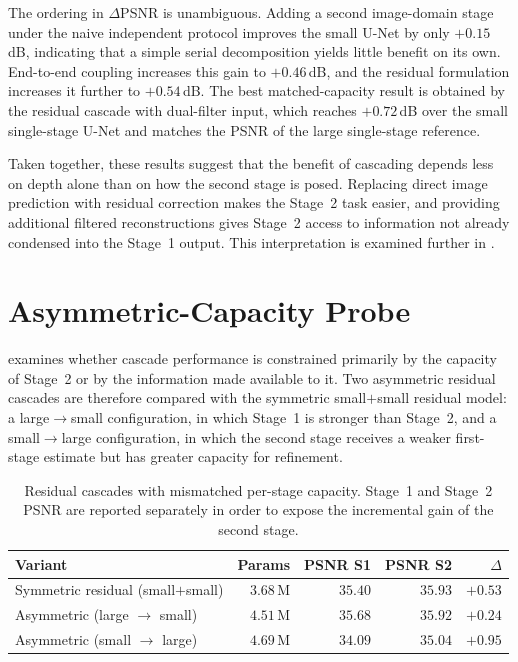 The ordering in $\Delta$PSNR is unambiguous. Adding a second image-domain stage under the naive independent protocol improves the small U-Net by only $+0.15$\,dB, indicating that a simple serial decomposition yields little benefit on its own. End-to-end coupling increases this gain to $+0.46$\,dB, and the residual formulation increases it further to $+0.54$\,dB. The best matched-capacity result is obtained by the residual cascade with dual-filter input, which reaches $+0.72$\,dB over the small single-stage U-Net and matches the PSNR of the large single-stage reference.

Taken together, these results suggest that the benefit of cascading depends less on depth alone than on how the second stage is posed. Replacing direct image prediction with residual correction makes the Stage~2 task easier, and providing additional filtered reconstructions gives Stage~2 access to information not already condensed into the Stage~1 output. This interpretation is examined further in .
\section{Asymmetric-Capacity Probe}
\label{sec:exp_asymmetric}

 examines whether cascade performance is constrained primarily by the capacity of Stage~2 or by the information made available to it. Two asymmetric residual cascades are therefore compared with the symmetric small$+$small residual model: a large$\rightarrow$small configuration, in which Stage~1 is stronger than Stage~2, and a small$\rightarrow$large configuration, in which the second stage receives a weaker first-stage estimate but has greater capacity for refinement.

\begin{table}[!htb]
    \centering
    \caption[Asymmetric-capacity residual cascades.]{%
        Residual cascades with mismatched per-stage capacity. Stage~1 and
        Stage~2 PSNR are reported separately in order to expose the
        incremental gain of the second stage.}
    \label{tab:exp_asym}
    \setlength{\tabcolsep}{6pt}
    \small
    \begin{tabular}{@{}l r r r r@{}}
        \toprule
        Variant                                 & Params     & PSNR S1 & PSNR S2 & $\Delta$ \\
        \midrule
        Symmetric residual (small$+$small)      & $3.68$\,M  & $35.40$ & $35.93$ & $+0.53$ \\
        Asymmetric (large $\rightarrow$ small)  & $4.51$\,M  & $35.68$ & $35.92$ & $+0.24$ \\
        Asymmetric (small $\rightarrow$ large)  & $4.69$\,M  & $34.09$ & $35.04$ & $+0.95$ \\
        \bottomrule
    \end{tabular}
\end{table}

